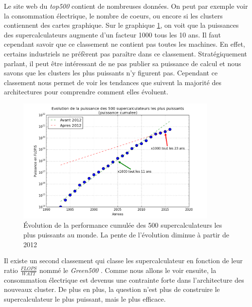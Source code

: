 Le site web du \textit{top500} contient de nombreuses données. On peut par exemple voir la consommation électrique, le nombre de coeurs, ou encore si les clusters contiennent des cartes graphique. Sur le graphique \ref{pic_top500perf_evo}, on voit que la puissances des supercalculateurs augmente d'un facteur 1000 tous les 10 ans.
Il faut cependant savoir que ce classement ne contient pas toutes les machines. En effet, certains industriels ne préfèrent pas paraître dans ce classement. Stratégiquement parlant, il peut être intéressant de ne pas publier sa puissance de calcul et nous savons que les clusters les plus puissants n'y figurent pas. Cependant ce classement nous permet de voir les tendances que suivent la majorité des architectures pour comprendre comment elles évoluent.\\

\begin{figure}
    \center
    \includegraphics[width=10cm]{images/Chapitre1/pic_top500perf_evo.png}
    \caption{\label{pic_top500perf_evo} Évolution de la performance cumulée des 500 supercalculateurs les plus puissants au monde. La pente de l'évolution diminue à partir de 2012}
\end{figure}


Il existe un second classement qui classe les supercalculateur en fonction de leur ratio $\frac{FLOPS}{WATT}$ nommé le \textit{Green500} \cite{feng2007green500}. Comme nous allons le voir ensuite, la consommation électrique est devenus une contrainte forte dans l'architecture des nouveaux cluster. De plus en plus, la question n'est plus de construire le supercalculateur le plus puissant, mais le plus efficace.

